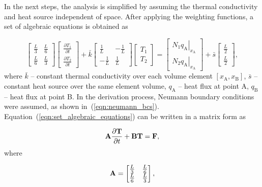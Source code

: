In the next steps, the analysis is simplified by assuming the thermal conductivity and heat source independent of space. After applying the weighting functions, a set of algebraic equations is obtained as 

\begin{equation}
    \begin{bmatrix}  
    \frac{L}{3} & \frac{L}{6} \\
    \frac{L}{6} & \frac{L}{3}
    \end{bmatrix} 
    \begin{bmatrix}  
    \frac{\partial T_1}{\partial t} \\
    \frac{\partial T_2}{\partial t}
    \end{bmatrix} 
    + \bar k
    \begin{bmatrix}  
    \frac{1}{L} & -\frac{1}{L} \\
    -\frac{1}{L} & \frac{1}{L}
    \end{bmatrix} 
    \begin{bmatrix}  
    T_1 \\
    T_2
    \end{bmatrix} 
    = 
    \begin{bmatrix}  
    N_1 \left. q_\text{A} \right|_{x_\text{A}} \\
    N_2 \left. q_\text{A} \right|_{x_\text{A}}
    \end{bmatrix} 
    + \bar s 
    \begin{bmatrix}  
    \frac{L}{2} \\
    \frac{L}{2}
    \end{bmatrix},
    \label{eqn:set_algebraic_equations}
\end{equation}
where $\bar k$ -- constant thermal conductivity over each volume element $\left[x_\text{A}, x_\text{B} \right]$,  $\bar s$ -- constant heat source over the same element volume, $q_\text{A}$ -- heat flux at point A, $q_\text{B}$ -- heat flux at point B. In the derivation process, Neumann boundary conditions were assumed, as shown in~(\ref{eqn:neumann_bcs}). Equation~(\ref{eqn:set_algebraic_equations}) can be written in a matrix form as

\begin{equation}
    \textbf{A} \frac{\partial \textbf{T}}{\partial t} + \textbf{B} \textbf{T} = \textbf{F},
\end{equation}
where 

\begin{equation}
    \textbf{A} = 
    \begin{bmatrix}  
    \frac{L}{3} & \frac{L}{6} \\
    \frac{L}{6} & \frac{L}{3}
    \end{bmatrix},
\end{equation}

